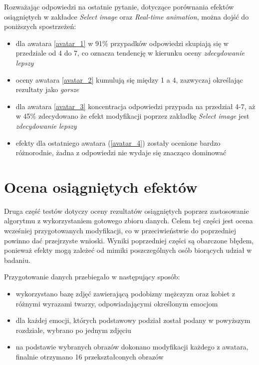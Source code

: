 Rozważając odpowiedzi na ostatnie pytanie, dotyczące porównania efektów osiągniętych w zakładce \textit{Select image} oraz \textit{Real-time animation}, można dojść do poniższych spostrzeżeń:
\begin{itemize}
    \item dla awatara \ref{avatar_1} w 91\% przypadków odpowiedzi skupiają się w przedziale od 4 do 7, co oznacza tendencję w kierunku oceny \textit{zdecydowanie lepszy}
    \item oceny awatara \ref{avatar_2} kumulują się między 1 a 4, zazwyczaj określając rezultaty jako \textit{gorsze}
    \item dla awatara \ref{avatar_3} koncentracja odpowiedzi przypada na przedział 4-7, aż w 45\% zdecydowano że efekt modyfikacji poprzez zakładkę \textit{Select image} jest \textit{zdecydowanie lepszy}
    \item efekty dla ostatniego awatara (\ref{avatar_4}) zostały ocenione bardzo różnorodnie, żadna z odpowiedzi nie wydaje się znacząco dominować
\end{itemize}



\section{Ocena osiągniętych efektów}
Druga część testów dotyczy oceny rezultatów osiągniętych poprzez zastosowanie algorytmu z wykorzystaniem gotowego zbioru danych. Celem tej części jest ocena wcześniej przygotowanych modyfikacji, co w przeciwieństwie do poprzedniej powinno dać przejrzyste wnioski. Wyniki poprzedniej części są obarczone błędem, ponieważ efekty mogą zależeć od mimiki poszczególnych osób biorących udział w badaniu. 

Przygotowanie danych przebiegało w następujący sposób:
\begin{itemize}
    \item wykorzystano bazę zdjęć zawierającą podobizny mężczyzn oraz kobiet z różnymi wyrazami twarzy, odpowiadającymi określonym emocjom
    \item dla każdej emocji, których podstawowy podział został podany w powyższym rozdziale, wybrano po jednym zdjęciu
    \item na podstawie wybranych obrazów dokonano modyfikacji każdego z awatara, finalnie otrzymano 16 przekształconych obrazów
\end{itemize}

